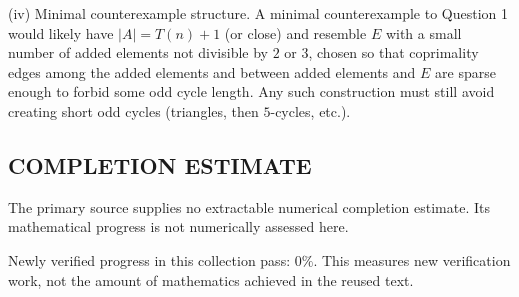 (iv) Minimal counterexample structure.
A minimal counterexample to Question 1 would likely have $|A|=T(n)+1$ (or close) and resemble $E$ with a small number of added elements not divisible by $2$ or $3$, chosen so that coprimality edges among the added elements and between added elements and $E$ are sparse enough to forbid some odd cycle length. Any such construction must still avoid creating short odd cycles (triangles, then $5$-cycles, etc.).




\subsection*{COMPLETION ESTIMATE}
The primary source supplies no extractable numerical completion estimate. Its mathematical progress is not numerically assessed here.

Newly verified progress in this collection pass: $0\%$. This measures new verification work, not the amount of mathematics achieved in the reused text.

